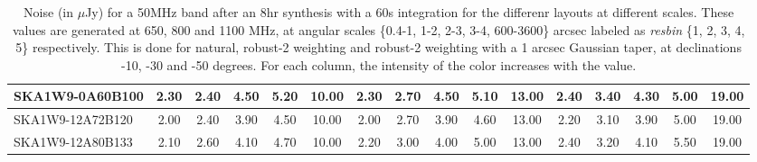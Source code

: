 \begin{table}[H]
{{\begin{tabular}{|lccccc||ccccc||ccccc|}
SKA1W9-0A60B100 & 2.30 \cellcolor{blue!33.75} & 2.40 \cellcolor{red!27.69} & 4.50 \cellcolor{green!60.00} & 5.20 \cellcolor{orange!60.00} & 10.00 \cellcolor{purple!60.00} & 2.30 \cellcolor{blue!33.75} & 2.70 \cellcolor{red!36.00} & 4.50 \cellcolor{green!60.00} & 5.10 \cellcolor{orange!60.00} & 13.00 \cellcolor{purple!18.00} & 2.40 \cellcolor{blue!41.33} & 3.40 \cellcolor{red!60.00} & 4.30 \cellcolor{green!60.00} & 5.00 \cellcolor{orange!46.00} & 19.00 \cellcolor{purple!60.00}\\ \hline 
SKA1W9-12A72B120 & 2.00 \cellcolor{blue!18.00} & 2.40 \cellcolor{red!27.69} & 3.90 \cellcolor{green!32.00} & 4.50 \cellcolor{orange!30.60} & 10.00 \cellcolor{purple!60.00} & 2.00 \cellcolor{blue!18.00} & 2.70 \cellcolor{red!36.00} & 3.90 \cellcolor{green!32.00} & 4.60 \cellcolor{orange!39.00} & 13.00 \cellcolor{purple!18.00} & 2.20 \cellcolor{blue!32.00} & 3.10 \cellcolor{red!46.00} & 3.90 \cellcolor{green!39.00} & 5.00 \cellcolor{orange!46.00} & 19.00 \cellcolor{purple!60.00}\\ \hline 
SKA1W9-12A80B133 & 2.10 \cellcolor{blue!23.25} & 2.60 \cellcolor{red!34.15} & 4.10 \cellcolor{green!41.33} & 4.70 \cellcolor{orange!39.00} & 10.00 \cellcolor{purple!60.00} & 2.20 \cellcolor{blue!28.50} & 3.00 \cellcolor{red!45.00} & 4.00 \cellcolor{green!36.67} & 5.00 \cellcolor{orange!55.80} & 13.00 \cellcolor{purple!18.00} & 2.40 \cellcolor{blue!41.33} & 3.20 \cellcolor{red!50.67} & 4.10 \cellcolor{green!49.50} & 5.50 \cellcolor{orange!60.00} & 19.00 \cellcolor{purple!60.00}\\ \hline 
\end{tabular}}
\vspace{-0.300000cm}
\hspace{1cm} 

\vspace{.25cm}
\caption{Noise (in $\mu$Jy) for a 50MHz band after an 8hr synthesis with a 60s integration for the differenr layouts at different scales. These values are generated at 650, 800 and 1100 MHz, at angular scales \{0.4-1, 1-2, 2-3, 3-4, 600-3600\} arcsec labeled as {\it resbin} \{1, 2, 3, 4, 5\} respectively. This is done for natural, robust-2 weighting and robust-2 weighting with a 1 arcsec Gaussian taper, at declinations -10, -30 and -50 degrees. For each column, the intensity of the color increases with the value.}\label{tab:noise50}}
 \end{table}
